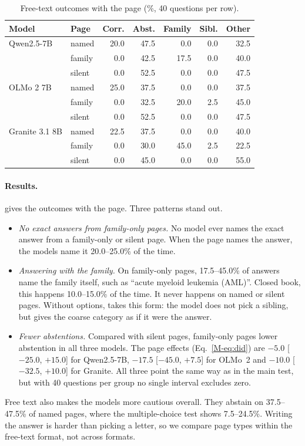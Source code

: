 \begin{table}[t]
\centering
\footnotesize
\setlength{\tabcolsep}{2.4pt}
\begin{tabular}{@{}llrrrrr@{}}
\toprule
Model & Page & Corr. & Abst. & Family & Sibl. & Other \\
\midrule
Qwen2.5-7B & named & 20.0 & 47.5 & 0.0 & 0.0 & 32.5 \\
 & family & 0.0 & 42.5 & 17.5 & 0.0 & 40.0 \\
 & silent & 0.0 & 52.5 & 0.0 & 0.0 & 47.5 \\
OLMo 2 7B & named & 25.0 & 37.5 & 0.0 & 0.0 & 37.5 \\
 & family & 0.0 & 32.5 & 20.0 & 2.5 & 45.0 \\
 & silent & 0.0 & 52.5 & 0.0 & 0.0 & 47.5 \\
Granite 3.1 8B & named & 22.5 & 37.5 & 0.0 & 0.0 & 40.0 \\
 & family & 0.0 & 30.0 & 45.0 & 2.5 & 22.5 \\
 & silent & 0.0 & 45.0 & 0.0 & 0.0 & 55.0 \\
\bottomrule
\end{tabular}
\caption{Free-text outcomes with the page (\%, 40 questions per row).}
\label{tab:free}
\end{table}

\paragraph{Results.}
 gives the outcomes with the page. Three patterns stand out.
\begin{itemize}
\item \emph{No exact answers from family-only pages.} No model ever names the exact answer from a family-only or silent page. When the page names the answer, the models name it 20.0--25.0\% of the time.
\item \emph{Answering with the family.} On family-only pages, 17.5--45.0\% of answers name the family itself, such as ``acute myeloid leukemia (AML)''. Closed book, this happens 10.0--15.0\% of the time. It never happens on named or silent pages. Without options, \clade{} takes this form: the model does not pick a sibling, but gives the coarse category as if it were the answer.
\item \emph{Fewer abstentions.} Compared with silent pages, family-only pages lower abstention in all three models. The page effects (Eq.~\ref{M-eq:did}) are $-5.0$ [$-25.0$, $+15.0$] for Qwen2.5-7B, $-17.5$ [$-45.0$, $+7.5$] for OLMo~2 and $-10.0$ [$-32.5$, $+10.0$] for Granite. All three point the same way as in the main test, but with 40 questions per group no single interval excludes zero.
\end{itemize}
Free text also makes the models more cautious overall. They abstain on 37.5--47.5\% of named pages, where the multiple-choice test shows 7.5--24.5\%. Writing the answer is harder than picking a letter, so we compare page types within the free-text format, not across formats.
